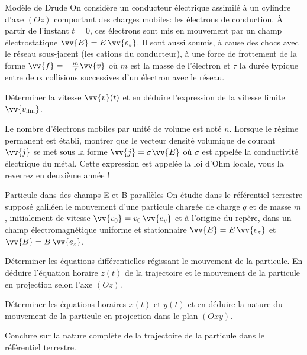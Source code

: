\begin{exo}[PCSI][1][colle]{Modèle de Drude}
On considère un conducteur électrique assimilé à un cylindre d'axe $(Oz)$ comportant des charges mobiles: les électrons de conduction. À partir de l'instant $t=0$, ces électrons sont mis en mouvement par un champ électrostatique $\vv{E}=E\,\vv{e_z}$. Il sont aussi soumis, à cause des chocs avec le réseau sous-jacent (les cations du conducteur), à une force de frottement de la forme $\vv{f}=-\frac{m}{\tau}\vv{v}$ où $m$ est la masse de l'électron et $\tau$ la durée typique entre deux collisions successives d'un électron avec le réseau.
\begin{quest}
\item Déterminer la vitesse $\vv{v}(t)$ et en déduire l'expression de la vitesse limite $\vv{v_{\rm{lim}}}$.
\item Le nombre d'électrons mobiles par unité de volume est noté $n$. Lorsque le régime permanent est établi, montrer que le vecteur densité volumique de courant $\vv{j}$ se met sous la forme $\vv{j}=\sigma\vv{E}$ où $\sigma$ est appelée la conductivité électrique du métal. Cette expression est appelée la loi d'Ohm locale, vous la reverrez en deuxième année !
\end{quest}
\end{exo}

\begin{exo}[PCSI][1][colle]{Particule dans des champs E et B parallèles}
On étudie dans le référentiel terrestre supposé galiléen le mouvement d'une particule chargée de charge $q$ et de masse $m$, initialement de vitesse $\vv{v_0}=v_{0}\,\vv{e_y}$ et à l'origine du repère, dans un champ électromagnétique uniforme et stationnaire $\vv{E}=E\,\vv{e_z}$ et $\vv{B}=B\,\vv{e_z}$.
\begin{quest}
\item Déterminer les équations différentielles régissant le mouvement de la particule. En déduire l'équation horaire $z(t)$ de la trajectoire et le mouvement de la particule en projection selon l'axe $(Oz)$.
\item Déterminer les équations horaires $x(t)$ et $y(t)$ et en déduire la nature du mouvement de la particule en projection dans le plan $(Oxy)$.
\item Conclure sur la nature complète de la trajectoire de la particule dans le référentiel terrestre.
\end{quest}
\end{exo}

